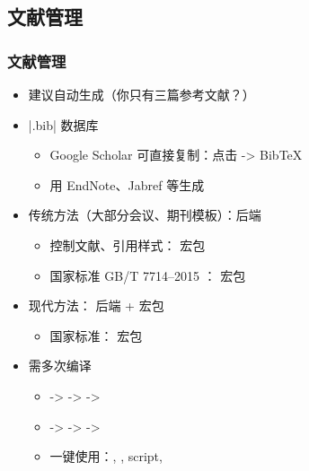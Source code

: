   \subsection{文献管理}
  \begin{frame}[fragile]
    \frametitle{文献管理}
    \begin{itemize}
      \item 建议自动生成\pause （你只有三篇参考文献？）\pause
      \item |.bib| 数据库
    
        \begin{itemize}
          \item Google Scholar 可直接复制：点击 \faQuoteRight \quad -> BibTeX
          \item 用 EndNote、Jabref 等生成
        \end{itemize} \pause
    
      \item 传统方法（大部分会议、期刊模板）：\BibTeX  后端
    
        \begin{itemize}
          \item 控制文献、引用样式： 宏包
          \item 国家标准 GB/T 7714--2015
                ：
                \alert{ 宏包}
        \end{itemize} \pause
    
      \item 现代方法： 后端 +  宏包
    
        \begin{itemize}
          \item 国家标准： 宏包
        \end{itemize} \pause
    
      \item 需多次编译
        \begin{itemize}
          \item \pdfLaTeX -> \BibTeX -> \pdfLaTeX -> \pdfLaTeX
          \item \XeLaTeX -> \BibTeX -> \XeLaTeX -> \XeLaTeX
          \item 一键使用：, ,  script, 
        \end{itemize}
      
    \end{itemize}
\end{frame}

